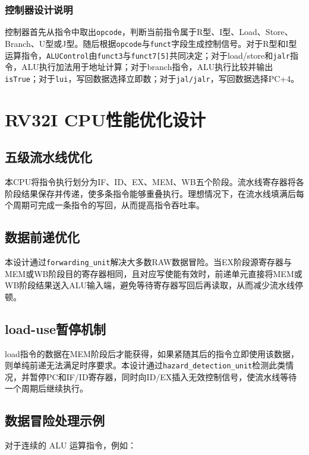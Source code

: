 \documentclass[12pt,a4paper]{ctexart}
\newcommand{\code}[1]{\texttt{#1}}
\begin{document}
\subsubsection{控制器设计说明}

控制器首先从指令中取出\code{opcode}，判断当前指令属于R型、I型、Load、Store、Branch、U型或J型。随后根据\code{opcode}与\code{funct}字段生成控制信号。对于R型和I型运算指令，\code{ALUControl}由\code{funct3}与\code{funct7[5]}共同决定；对于load/store和\code{jalr}指令，ALU执行加法用于地址计算；对于branch指令，ALU执行比较并输出\code{isTrue}；对于\code{lui}，写回数据选择立即数；对于\code{jal/jalr}，写回数据选择PC+4。

\section{RV32I CPU性能优化设计}

\subsection{五级流水线优化}

本CPU将指令执行划分为IF、ID、EX、MEM、WB五个阶段。流水线寄存器将各阶段结果保存并传递，使多条指令能够重叠执行。理想情况下，在流水线填满后每个周期可完成一条指令的写回，从而提高指令吞吐率。

\subsection{数据前递优化}

本设计通过\code{forwarding\_unit}解决大多数RAW数据冒险。当EX阶段源寄存器与MEM或WB阶段目的寄存器相同，且对应写使能有效时，前递单元直接将MEM或WB阶段结果送入ALU输入端，避免等待寄存器写回后再读取，从而减少流水线停顿。

\subsection{load-use暂停机制}

load指令的数据在MEM阶段后才能获得，如果紧随其后的指令立即使用该数据，则单纯前递无法满足时序要求。本设计通过\code{hazard\_detection\_unit}检测此类情况，并暂停PC和IF/ID寄存器，同时向ID/EX插入无效控制信号，使流水线等待一个周期后继续执行。

\subsection{数据冒险处理示例}

对于连续的 ALU 运算指令，例如：
\end{document}
